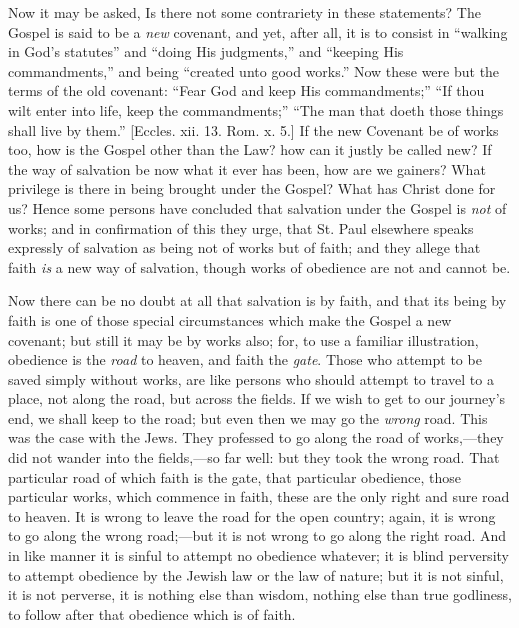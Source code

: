 Now it may be asked, Is there not some contrariety in these
statements? The Gospel is said to be a \emph{new} covenant, and yet,
after all, it is to consist in ``walking in God's statutes''
and ``doing His judgments,'' and ``keeping His
commandments,'' and being ``created unto good works.'' Now
these were but the terms of the old covenant: ``Fear God and keep
His commandments;'' ``If thou wilt enter into life, keep the
commandments;'' ``The man that doeth those things shall live
by them.'' [Eccles. xii. 13. Rom. x. 5.] If the new Covenant be of
works too, how is the Gospel other than the Law? how can it justly be
called new? If the way of salvation be now what it ever has been, how
are we gainers? What privilege is there in being brought under the
Gospel? What has Christ done for us? Hence some persons have concluded
that salvation under the Gospel is \emph{not} of works; and in
confirmation of this they urge, that St. Paul elsewhere speaks
expressly of salvation as being not of works but of faith; and they
allege that faith \emph{is} a new way of salvation, though works of
obedience are not and cannot be.

Now there can be no doubt at all that salvation is by faith, and
that its being by faith is one of those special circumstances which
make the Gospel a new covenant; but still it may be by works also;
for, to use a familiar illustration, obedience is the \emph{road} to
heaven, and faith the \emph{gate}. Those who attempt to be saved
simply without works, are like persons who should attempt to travel to
a place, not along the road, but across the fields. If we wish to get
to our journey's end, we shall keep to the road; but even then we may
go the \emph{wrong} road. This was the case with the Jews. They
professed to go along the road of works,—they did not wander into
the fields,—so far well: but they took the wrong road. That
particular road of which faith is the gate, that particular obedience,
those particular works, which commence in faith, these are the only
right and sure road to heaven. It is wrong to leave the road for the
open country; again, it is wrong to go along the wrong road;—but it
is not wrong to go along the right road. And in like manner it is
sinful to attempt no obedience whatever; it is blind perversity to
attempt obedience by the Jewish law or the law of nature; but it is
not sinful, it is not perverse, it is nothing else than wisdom,
nothing else than true godliness, to follow after that obedience which
is of faith.

